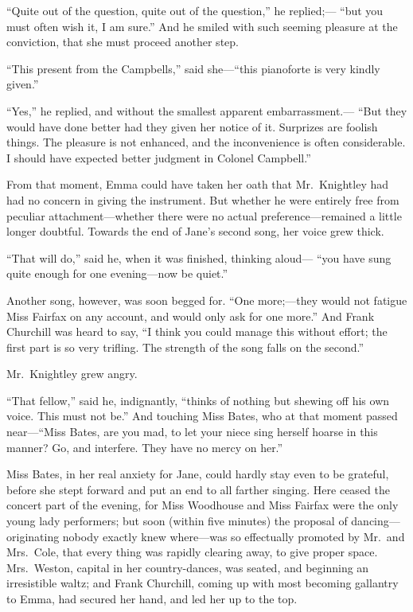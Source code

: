 ``Quite out of the question, quite out of the question,'' he replied;---%
``but you must often wish it, I am sure.''  And he smiled with such
seeming pleasure at the conviction, that she must proceed another step.

``This present from the Campbells,'' said she---``this pianoforte
is very kindly given.''

``Yes,'' he replied, and without the smallest apparent embarrassment.---%
``But they would have done better had they given her notice of it.
Surprizes are foolish things.  The pleasure is not enhanced, and the
inconvenience is often considerable.  I should have expected better
judgment in Colonel Campbell.''

From that moment, Emma could have taken her oath that Mr.\ Knightley
had had no concern in giving the instrument.  But whether he
were entirely free from peculiar attachment---whether there
were no actual preference---remained a little longer doubtful.
Towards the end of Jane's second song, her voice grew thick.

``That will do,'' said he, when it was finished, thinking aloud---%
``you have sung quite enough for one evening---now be quiet.''

Another song, however, was soon begged for.  ``One more;---they would
not fatigue Miss Fairfax on any account, and would only ask for
one more.''  And Frank Churchill was heard to say, ``I think you could
manage this without effort; the first part is so very trifling.
The strength of the song falls on the second.''

Mr.\ Knightley grew angry.

``That fellow,'' said he, indignantly, ``thinks of nothing but shewing
off his own voice.  This must not be.''  And touching Miss Bates,
who at that moment passed near---``Miss Bates, are you mad, to let
your niece sing herself hoarse in this manner?  Go, and interfere.
They have no mercy on her.''

Miss Bates, in her real anxiety for Jane, could hardly stay even
to be grateful, before she stept forward and put an end to all
farther singing.  Here ceased the concert part of the evening,
for Miss Woodhouse and Miss Fairfax were the only young lady performers;
but soon (within five minutes) the proposal of dancing---%
originating nobody exactly knew where---was so effectually promoted
by Mr.\ and Mrs.\ Cole, that every thing was rapidly clearing away,
to give proper space.  Mrs.\ Weston, capital in her country-dances,
was seated, and beginning an irresistible waltz; and Frank Churchill,
coming up with most becoming gallantry to Emma, had secured her hand,
and led her up to the top.

